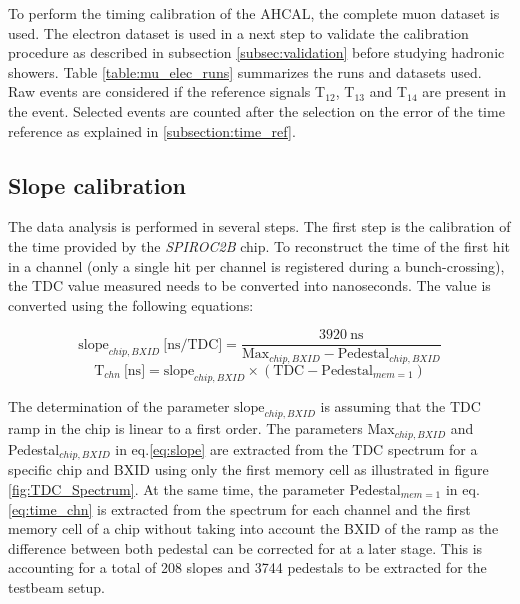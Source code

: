 To perform the timing calibration of the AHCAL, the complete muon dataset is used. The electron dataset is used in a next step to validate the calibration procedure as described in subsection \ref{subsec:validation} before studying hadronic showers. Table \ref{table:mu_elec_runs} summarizes the runs and datasets used. Raw events are considered if the reference signals T$_{12}$,  T$_{13}$ and T$_{14}$ are present in the event. Selected events are counted after the selection on the error of the time reference as explained in \ref{subsection:time_ref}.

\subsection{Slope calibration}
\label{subsec:slope_calib}

The data analysis is performed in several steps. The first step is the calibration of the time provided by the \textit{SPIROC2B} chip. To reconstruct the time of the first hit in a channel (only a single hit per channel is registered during a bunch-crossing), the TDC value measured needs to be converted into nanoseconds. The value is converted using the following equations:

\begin{equation} \label{eq:slope}
	\text{slope}_{chip, BXID} \: \text{[ns/TDC]} = \frac{3920 \: \text{ns}}{\text{Max}_{chip, BXID} - \text{Pedestal}_{chip, BXID}}
\end{equation}
\begin{equation} \label{eq:time_chn}
	\text{T}_{chn} \: \text{[ns]} = \text{slope}_{chip, BXID} \times (\text{TDC} - \text{Pedestal}_{mem=1} )
\end{equation}

The determination of the parameter $\text{slope}_{chip, BXID}$ is assuming that the TDC ramp in the chip is linear to a first order. The parameters Max$_{chip, BXID}$ and Pedestal$_{chip, BXID}$ in eq.\ref{eq:slope} are extracted from the TDC spectrum for a specific chip and BXID using only the first memory cell as illustrated in figure \ref{fig:TDC_Spectrum}. At the same time, the parameter Pedestal$_{mem=1}$ in eq.\ref{eq:time_chn} is extracted from the spectrum for each channel and the first memory cell of a chip without taking into account the BXID of the ramp as the difference between both pedestal can be corrected for at a later stage. This is accounting for a total of 208 slopes and 3744 pedestals to be extracted for the testbeam setup.

